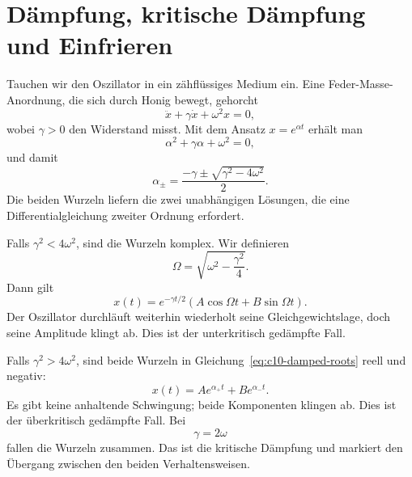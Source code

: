 \section{Dämpfung, kritische Dämpfung und Einfrieren}

Tauchen wir den Oszillator in ein zähflüssiges Medium ein. Eine Feder-Masse-Anordnung, die sich durch Honig bewegt, gehorcht
\begin{equation}
\ddot x+\gamma\dot x+\omega^2x=0,
\label{eq:c10-damped}
\end{equation}
wobei \(\gamma>0\) den Widerstand misst. Mit dem Ansatz \(x=e^{\alpha t}\) erhält man
\begin{equation}
\alpha^2+\gamma\alpha+\omega^2=0,
\end{equation}
und damit
\begin{equation}
\alpha_\pm
=\frac{-\gamma\pm\sqrt{\gamma^2-4\omega^2}}{2}.
\label{eq:c10-damped-roots}
\end{equation}
Die beiden Wurzeln liefern die zwei unabhängigen Lösungen, die eine Differentialgleichung zweiter Ordnung erfordert.

\begin{classroomqa}
\end{classroomqa}

Falls \(\gamma^2<4\omega^2\), sind die Wurzeln komplex. Wir definieren
\[
\Omega=\sqrt{\omega^2-\frac{\gamma^2}{4}}.
\]
Dann gilt
\begin{equation}
x(t)=e^{-\gamma t/2}
\left(A\cos\Omega t+B\sin\Omega t\right).
\label{eq:c10-underdamped}
\end{equation}
Der Oszillator durchläuft weiterhin wiederholt seine Gleichgewichtslage, doch seine Amplitude klingt ab. Dies ist der unterkritisch gedämpfte Fall.

Falls \(\gamma^2>4\omega^2\), sind beide Wurzeln in Gleichung~\eqref{eq:c10-damped-roots} reell und negativ:
\begin{equation}
x(t)=A e^{\alpha_+t}+B e^{\alpha_-t}.
\label{eq:c10-overdamped}
\end{equation}
Es gibt keine anhaltende Schwingung; beide Komponenten klingen ab. Dies ist der überkritisch gedämpfte Fall. Bei
\begin{equation}
\gamma=2\omega
\label{eq:c10-critical}
\end{equation}
fallen die Wurzeln zusammen. Das ist die kritische Dämpfung und markiert den Übergang zwischen den beiden Verhaltensweisen.


